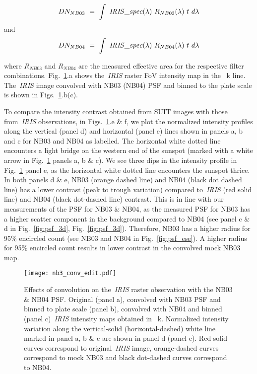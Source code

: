 $$DN_{NB03}~=~\int~{\it IRIS}\_spec(\lambda)~R_{NB03}(\lambda)~t~d\lambda$$
and 
$$DN_{NB04}~=~\int~{\it IRIS}\_spec(\lambda)~R_{NB04}(\lambda)~t~d\lambda$$

\noindent where $R_{NB03}$ and $R_{NB04}$ are the measured effective area for the respective filter combinations. Fig.~\ref{fig:nb3_conv}.a shows the~{\it IRIS} raster FoV intensity map in the ~k line. The~{\it IRIS} image convolved with NB03 (NB04) PSF and binned to the {\suit} plate scale is shown in Figs.~\ref{fig:nb3_conv}.b(c).

To compare the intensity contrast obtained from SUIT images with those from~{\it IRIS} observations, in Figs.~\ref{fig:nb3_conv}.e \& f, we plot the normalized intensity profiles along the vertical (panel d) and horizontal (panel e) lines shown in panels a, b and c for NB03 and NB04 as labelled. The horizontal white dotted line encounters a light bridge on the western end of the sunspot (marked with a white arrow in Fig.~\ref{fig:nb3_conv} panels a, b \& c). We see three dips in the intensity profile in Fig.~\ref{fig:nb3_conv} panel e, as the horizontal white dotted line encounters the sunspot thrice. In both panels d \& e, NB03 (orange dashed line) and NB04 (black dot dashed line) has a lower contrast (peak to trough variation) compared to~{\it IRIS} (red solid line) and NB04 (black dot-dashed line) contrast. This is in line with our measurements of the PSF for NB03 \& NB04, as the measured PSF for NB03 has a higher scatter component in the background compared to NB04 (see panel c \& d in Fig.~\ref{fig:psf_3d}, Fig.~\ref{fig:psf_3d}). Therefore,  NB03 has a higher radius for 95\% encircled count (see NB03 and NB04 in Fig.~\ref{fig:psf_ese}). A higher radius for 95\% encircled count results in lower contrast in the convolved mock NB03 map.

\begin{figure}
    \centering
    \texttt{[image: nb3\_conv\_edit.pdf]}
    \caption[Effects of convolution on the~{\it IRIS} raster observation with the NB03 \& NB04 PSF]{Effects of convolution on the~{\it IRIS} raster observation with the NB03 \& NB04 PSF. Original (panel a), convolved with NB03 PSF and binned to {\suit} plate scale (panel b), convolved with NB04 and binned (panel c)~{\it IRIS} intensity maps obtained in ~k. Normalized intensity variation along the vertical-solid (horizontal-dashed) white line marked in panel a, b \& c are shown in panel d (panel e). Red-solid curves correspond to original~{\it IRIS} image, orange-dashed curves correspond to mock NB03 and black dot-dashed curves correspond to NB04.}
\label{fig:nb3_conv}
\end{figure}

